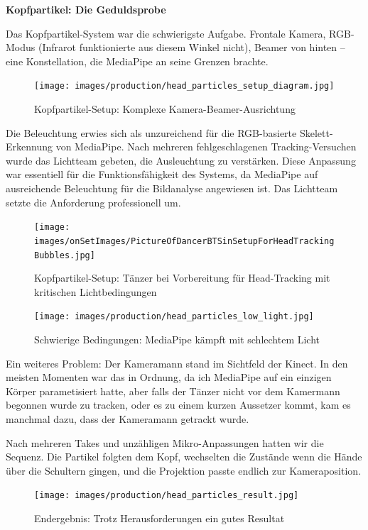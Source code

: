 \newpage

\textbf{Kopfpartikel: Die Geduldsprobe}

Das Kopfpartikel-System war die schwierigste Aufgabe. Frontale Kamera, RGB-Modus (Infrarot funktionierte aus diesem Winkel nicht), Beamer von hinten – eine Konstellation, die MediaPipe an seine Grenzen brachte.

\begin{figure}[h]
   \centering
   \texttt{[image: images/production/head\_particles\_setup\_diagram.jpg]}
   \caption{Kopfpartikel-Setup: Komplexe Kamera-Beamer-Ausrichtung}
   \label{fig:head_setup}
\end{figure}

Die Beleuchtung erwies sich als unzureichend für die RGB-basierte Skelett-Erkennung von MediaPipe. Nach mehreren fehlgeschlagenen Tracking-Versuchen wurde das Lichtteam gebeten, die Ausleuchtung zu verstärken. Diese Anpassung war essentiell für die Funktionsfähigkeit des Systems, da MediaPipe auf ausreichende Beleuchtung für die Bildanalyse angewiesen ist. Das Lichtteam setzte die Anforderung professionell um.

\begin{figure}[h]
   \centering
   \texttt{[image: images/onSetImages/PictureOfDancerBTSinSetupForHeadTrackingBubbles.jpg]}
   \caption{Kopfpartikel-Setup: Tänzer bei Vorbereitung für Head-Tracking mit kritischen Lichtbedingungen}
   \label{fig:dancer_head_tracking}
\end{figure}

\begin{figure}[h]
   \centering
   \texttt{[image: images/production/head\_particles\_low\_light.jpg]}
   \caption{Schwierige Bedingungen: MediaPipe kämpft mit schlechtem Licht}
   \label{fig:low_light_tracking}
\end{figure}

Ein weiteres Problem: Der Kameramann stand im Sichtfeld der Kinect. In den meisten Momenten war das in Ordnung, da ich MediaPipe auf ein einzigen Körper parametisiert hatte, aber falls der Tänzer nicht vor dem Kamermann begonnen wurde zu tracken, oder es zu einem kurzen Aussetzer kommt, kam es manchmal dazu, dass der Kameramann getrackt wurde.

Nach mehreren Takes und unzähligen Mikro-Anpassungen hatten wir die Sequenz. Die Partikel folgten dem Kopf, wechselten die Zustände wenn die Hände über die Schultern gingen, und die Projektion passte endlich zur Kameraposition.

\begin{figure}[h]
   \centering
   \texttt{[image: images/production/head\_particles\_result.jpg]}
   \caption{Endergebnis: Trotz Herausforderungen ein gutes Resultat}
   \label{fig:head_result}
\end{figure}

